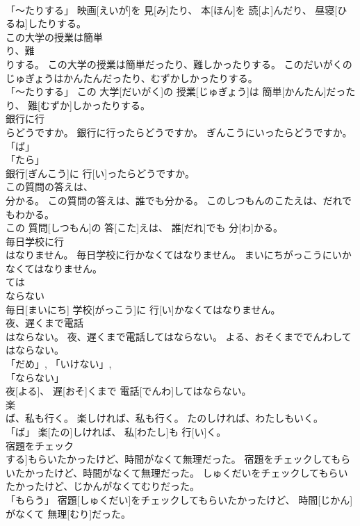 \documentclass[8pt]{extreport}
\begin{document}
\begin{CJK}{UTF8}{min}
\\	「～たりする」	映画[えいが]を 見[み]たり、 本[ほん]を 読[よ]んだり、 昼寝[ひるね]したりする。		
\\	この大学の授業は簡単
\\	り、難
\\	りする。	この大学の授業は簡単だったり、難しかったりする。	このだいがくのじゅぎょうはかんたんだったり、むずかしかったりする。	
\\	「～たりする」	この 大学[だいがく]の 授業[じゅぎょう]は 簡単[かんたん]だったり、 難[むずか]しかったりする。		
\\	銀行に行
\\	らどうですか。	銀行に行ったらどうですか。	ぎんこうにいったらどうですか。	
\\	「ば」 
\\	「たら」 
\\	銀行[ぎんこう]に 行[い]ったらどうですか。		
\\	この質問の答えは、
\\	分かる。	この質問の答えは、誰でも分かる。	このしつもんのこたえは、だれでもわかる。	
\\	この 質問[しつもん]の 答[こた]えは、 誰[だれ]でも 分[わ]かる。		
\\	毎日学校に行
\\	はなりません。	毎日学校に行かなくてはなりません。	まいにちがっこうにいかなくてはなりません。	
\\	ては
\\	ならない
\\	毎日[まいにち] 学校[がっこう]に 行[い]かなくてはなりません。		
\\	夜、遅くまで電話
\\	はならない。	夜、遅くまで電話してはならない。	よる、おそくまででんわしてはならない。	
\\	「だめ」, 「いけない」, 
\\	「ならない」 
\\	夜[よる]、 遅[おそ]くまで 電話[でんわ]してはならない。		
\\	楽
\\	ば、私も行く。	楽しければ、私も行く。	たのしければ、わたしもいく。	
\\	「ば」	楽[たの]しければ、 私[わたし]も 行[い]く。		
\\	宿題をチェック
\\	する]もらいたかったけど、時間がなくて無理だった。	宿題をチェックしてもらいたかったけど、時間がなくて無理だった。	しゅくだいをチェックしてもらいたかったけど、じかんがなくてむりだった。	
\\	「もらう」	宿題[しゅくだい]をチェックしてもらいたかったけど、 時間[じかん]がなくて 無理[むり]だった。		

\end{CJK}
\end{document}
